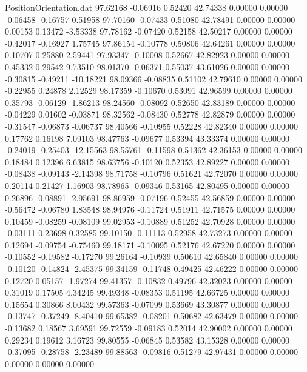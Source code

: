 \begin{filecontents}{PositionOrientation.dat}
  97.62168   -0.06916    0.52420    42.74338    0.00000    0.00000   -0.06458   -0.16757    0.51958
  97.70160   -0.07433    0.51080    42.78491    0.00000    0.00000    0.00153    0.13472   -3.53338
  97.78162   -0.07420    0.52158    42.50217    0.00000    0.00000   -0.42017   -0.16927    1.75745
  97.86154   -0.10778    0.50806    42.64261    0.00000    0.00000    0.10707    0.25880    2.59441
  97.93347   -0.10008    0.52667    42.82923    0.00000    0.00000    0.45332    0.29542    9.73510
  98.01370   -0.06371    0.55037    43.61026    0.00000    0.00000   -0.30815   -0.49211  -10.18221
  98.09366   -0.08835    0.51102    42.79610    0.00000    0.00000   -0.22955    0.24878    2.12529
  98.17359   -0.10670    0.53091    42.96599    0.00000    0.00000    0.35793   -0.06129   -1.86213
  98.24560   -0.08092    0.52650    42.83189    0.00000    0.00000   -0.04229    0.01602   -0.03871
  98.32562   -0.08430    0.52778    42.82879    0.00000    0.00000   -0.31547   -0.06873   -0.06737
  98.40566   -0.10955    0.52228    42.82340    0.00000    0.00000    0.17762    0.16198    7.09103
  98.47763   -0.09677    0.53394    43.33374    0.00000    0.00000   -0.24019   -0.25403  -12.15563
  98.55761   -0.11598    0.51362    42.36153    0.00000    0.00000    0.18484    0.12396    6.63815
  98.63756   -0.10120    0.52353    42.89227    0.00000    0.00000   -0.08438   -0.09143   -2.14398
  98.71758   -0.10796    0.51621    42.72070    0.00000    0.00000    0.20114    0.21427    1.16903
  98.78965   -0.09346    0.53165    42.80495    0.00000    0.00000    0.26896   -0.08891   -2.95691
  98.86959   -0.07196    0.52455    42.56859    0.00000    0.00000   -0.56472   -0.06780    1.83548
  98.94976   -0.11724    0.51911    42.71575    0.00000    0.00000    0.10459   -0.08259   -0.08109
  99.02953   -0.10889    0.51252    42.70928    0.00000    0.00000   -0.03111    0.23698    0.32585
  99.10150   -0.11113    0.52958    42.73273    0.00000    0.00000    0.12694   -0.09754   -0.75460
  99.18171   -0.10095    0.52176    42.67220    0.00000    0.00000   -0.10552   -0.19582   -0.17270
  99.26164   -0.10939    0.50610    42.65840    0.00000    0.00000   -0.10120   -0.14824   -2.45375
  99.34159   -0.11748    0.49425    42.46222    0.00000    0.00000    0.12720    0.05157   -1.97274
  99.41357   -0.10832    0.49796    42.32023    0.00000    0.00000    0.31019    0.17505    4.34245
  99.49348   -0.08353    0.51195    42.66725    0.00000    0.00000    0.15654    0.30866    8.00432
  99.57363   -0.07099    0.53669    43.30877    0.00000    0.00000   -0.13747   -0.37249   -8.40410
  99.65382   -0.08201    0.50682    42.63479    0.00000    0.00000   -0.13682    0.18567    3.69591
  99.72559   -0.09183    0.52014    42.90002    0.00000    0.00000    0.29234    0.19612    3.16723
  99.80555   -0.06845    0.53582    43.15328    0.00000    0.00000   -0.37095   -0.28758   -2.23489
  99.88563   -0.09816    0.51279    42.97431    0.00000    0.00000    0.00000    0.00000    0.00000
\end{filecontents}
